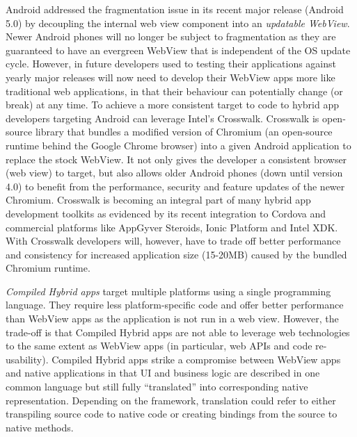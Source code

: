 \documentclass[thesis.tex]{subfiles}
\begin{document}
Android addressed the fragmentation issue in its recent major release (Android 5.0) by decoupling the internal web view component into an \textit{updatable WebView}. Newer Android phones will no longer be subject to fragmentation as they are guaranteed to have an evergreen WebView that is independent of the OS update cycle. However, in future developers used to testing their applications against yearly major releases will now need to develop their WebView apps more like traditional web applications, in that their behaviour can potentially change (or break) at any time. To achieve a more consistent target to code to hybrid app developers targeting Android can leverage Intel's Crosswalk. Crosswalk is open-source library that bundles a modified version of Chromium (an open-source runtime behind the Google Chrome browser) into a given Android application to replace the stock WebView. It not only gives the developer a consistent browser (web view) to target, but also allows older Android phones (down until version 4.0) to benefit from the performance, security and feature updates of the newer Chromium. Crosswalk is becoming an integral part of many hybrid app development toolkits as evidenced by its recent integration to Cordova and commercial platforms like AppGyver Steroids, Ionic Platform and Intel XDK. With Crosswalk developers will, however, have to trade off better performance and consistency for increased application size (15-20MB) caused by the bundled Chromium runtime.

\textit{Compiled Hybrid apps} target multiple platforms using a single programming language. They require less platform-specific code and offer better performance than WebView apps as the application is not run in a web view. However, the trade-off is that Compiled Hybrid apps are not able to leverage web technologies to the same extent as WebView apps (in particular, web APIs and code re-usability). Compiled Hybrid apps strike a compromise between WebView apps and native applications in that UI and business logic are described in one common language but still fully ``translated'' into corresponding native representation. Depending on the framework, translation could refer to either transpiling source code to native code or creating bindings from the source to native methods.
\end{document}
